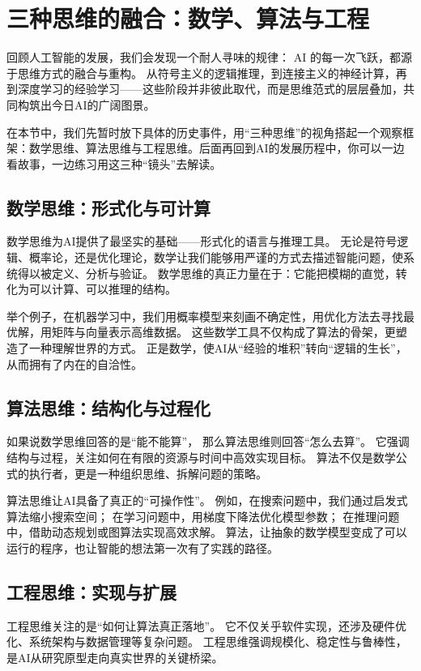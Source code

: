 \section{三种思维的融合：数学、算法与工程}

回顾人工智能的发展，我们会发现一个耐人寻味的规律：  
AI 的每一次飞跃，都源于思维方式的融合与重构。  
从符号主义的逻辑推理，到连接主义的神经计算，再到深度学习的经验学习——这些阶段并非彼此取代，而是思维范式的层层叠加，共同构筑出今日AI的广阔图景。

在本节中，我们先暂时放下具体的历史事件，用“三种思维”的视角搭起一个观察框架：数学思维、算法思维与工程思维。后面再回到AI的发展历程中，你可以一边看故事，一边练习用这三种“镜头”去解读。

\subsection{数学思维：形式化与可计算}

数学思维为AI提供了最坚实的基础——形式化的语言与推理工具。  
无论是符号逻辑、概率论，还是优化理论，数学让我们能够用严谨的方式去描述智能问题，使系统得以被定义、分析与验证。  
数学思维的真正力量在于：它能把模糊的直觉，转化为可以计算、可以推理的结构。

举个例子，在机器学习中，我们用概率模型来刻画不确定性，用优化方法去寻找最优解，用矩阵与向量表示高维数据。  
这些数学工具不仅构成了算法的骨架，更塑造了一种理解世界的方式。  
正是数学，使AI从“经验的堆积”转向“逻辑的生长”，从而拥有了内在的自洽性。

\subsection{算法思维：结构化与过程化}

如果说数学思维回答的是“能不能算”，  
那么算法思维则回答“怎么去算”。  
它强调结构与过程，关注如何在有限的资源与时间中高效实现目标。  
算法不仅是数学公式的执行者，更是一种组织思维、拆解问题的策略。

算法思维让AI具备了真正的“可操作性”。  
例如，在搜索问题中，我们通过启发式算法缩小搜索空间；  
在学习问题中，用梯度下降法优化模型参数；  
在推理问题中，借助动态规划或图算法实现高效求解。  
算法，让抽象的数学模型变成了可以运行的程序，也让智能的想法第一次有了实践的路径。

\subsection{工程思维：实现与扩展}

工程思维关注的是“如何让算法真正落地”。  
它不仅关乎软件实现，还涉及硬件优化、系统架构与数据管理等复杂问题。  
工程思维强调规模化、稳定性与鲁棒性，是AI从研究原型走向真实世界的关键桥梁。

